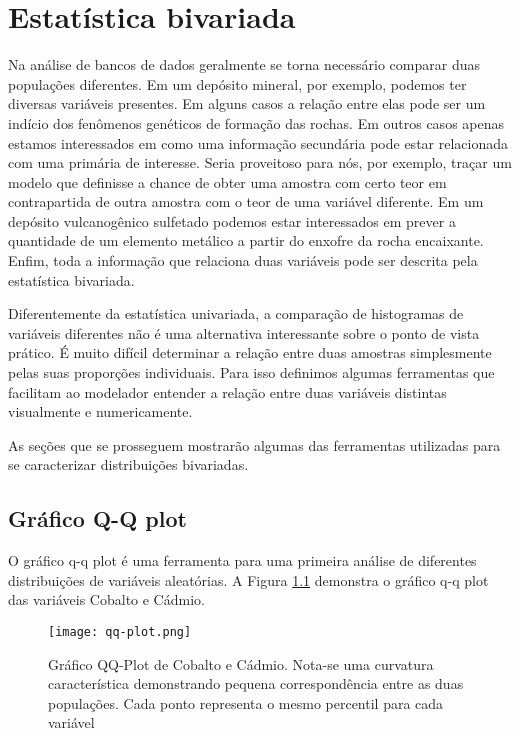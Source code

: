 \chapter{Estatística bivariada}

Na análise de bancos de dados geralmente se torna necessário comparar duas populações diferentes. Em um depósito mineral, por exemplo, podemos ter diversas variáveis presentes. Em alguns casos a relação entre elas pode ser um indício dos fenômenos genéticos de formação das rochas. Em outros casos apenas estamos interessados em como uma informação secundária pode estar relacionada com uma primária de interesse. Seria proveitoso para nós, por exemplo, traçar um modelo que definisse a chance de obter uma amostra com certo teor em contrapartida de outra amostra com o teor de uma variável diferente. Em um depósito vulcanogênico sulfetado podemos estar interessados em prever a quantidade de um elemento metálico a partir do enxofre da rocha encaixante. Enfim, toda a informação que relaciona duas variáveis pode ser descrita pela estatística bivariada.  

Diferentemente da estatística univariada, a comparação de histogramas de variáveis diferentes não é uma alternativa interessante sobre o ponto de vista prático. É muito difícil determinar a relação entre duas amostras simplesmente pelas suas proporções individuais. Para isso definimos algumas ferramentas que facilitam ao modelador entender a relação entre duas variáveis distintas visualmente e numericamente. 

As seções que se prosseguem mostrarão algumas das ferramentas utilizadas para se caracterizar distribuições bivariadas. 

\section{Gráfico Q-Q plot}

O gráfico q-q plot é uma ferramenta para uma primeira análise de diferentes distribuições de variáveis aleatórias. A Figura \ref{QQplot} demonstra o gráfico q-q plot das variáveis Cobalto e Cádmio.

\begin{figure}[H]
	\centering
	\texttt{[image: qq-plot.png]}	
	\caption{Gráfico QQ-Plot de Cobalto e Cádmio. Nota-se uma curvatura característica demonstrando pequena correspondência entre as duas populações. Cada ponto representa o mesmo percentil para cada variável }
	\label{QQplot}
\end{figure}

